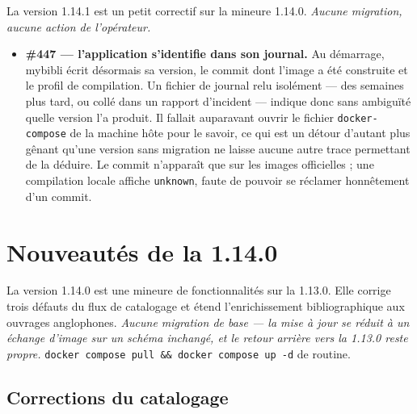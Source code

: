 La version 1.14.1 est un petit correctif sur la mineure 1.14.0.
\emph{Aucune migration, aucune action de l'opérateur.}

\begin{itemize}
  \item \textbf{\#447 \string— l'application s'identifie dans son
        journal.} Au démarrage, mybibli écrit désormais sa version,
        le commit dont l'image a été construite et le profil de
        compilation. Un fichier de journal relu isolément — des
        semaines plus tard, ou collé dans un rapport d'incident —
        indique donc sans ambiguïté quelle version l'a produit. Il
        fallait auparavant ouvrir le fichier \texttt{docker-compose}
        de la machine hôte pour le savoir, ce qui est un détour
        d'autant plus gênant qu'une version sans migration ne laisse
        aucune autre trace permettant de la déduire. Le commit
        n'apparaît que sur les images officielles ; une compilation
        locale affiche \texttt{unknown}, faute de pouvoir se
        réclamer honnêtement d'un commit.
\end{itemize}

\section{Nouveautés de la 1.14.0}\label{sec:whats-new-1.14.0}

La version 1.14.0 est une mineure de fonctionnalités sur la 1.13.0.
Elle corrige trois défauts du flux de catalogage et étend
l'enrichissement bibliographique aux ouvrages anglophones.
\emph{Aucune migration de base — la mise à jour se réduit à un
échange d'image sur un schéma inchangé, et le retour arrière vers la
1.13.0 reste propre.} \texttt{docker compose pull \&\& docker compose
up -d} de routine.

\subsection*{Corrections du catalogage}

